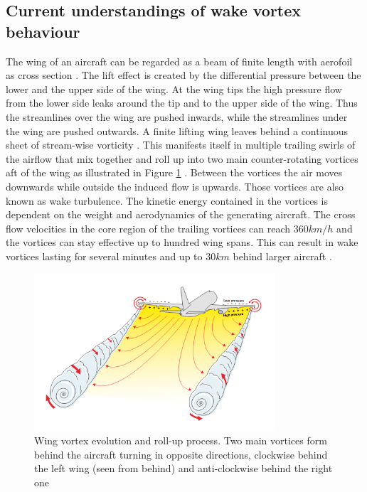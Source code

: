 %



\subsection{Current understandings of wake vortex behaviour}
The wing of an aircraft can be regarded as a beam of finite length with aerofoil as cross section \cite{hansen2015aerodynamics}. The lift effect is created by the differential pressure between the lower and the upper side of the wing. At the wing tips the high pressure flow from the lower side leaks around the tip and to the upper side of the wing. Thus the streamlines over the wing are pushed inwards, while the streamlines under the wing are pushed outwards. A finite lifting wing leaves behind a continuous sheet of stream-wise vorticity  \cite{hansen2015aerodynamics}.  This manifests itself in multiple trailing swirls of the airflow that mix together and roll up into two main counter-rotating vortices aft of the wing as illustrated in Figure \ref{fig:vortex_develop} \cite{magazine_aibus_safety, Breitsamter2011Feb, gerz_commercial_2002}. Between the vortices the air moves downwards while outside the induced flow is upwards. Those vortices are also known as wake turbulence. 
The kinetic energy contained in the vortices is dependent on the weight and aerodynamics of the generating aircraft. The cross flow velocities in the core region of the trailing vortices can reach $360km/h$ and the vortices can stay effective up to hundred wing spans. This can result in wake vortices lasting for several minutes and up to $30km$ behind larger aircraft \cite{Breitsamter2011Feb, gerz_commercial_2002}. 

\begin{figure}
    \centering
    \includegraphics[width=0.8\textwidth]{graphics/WakeVortexPlane.png}
    \caption[Wake vortex roll-up process]{Wing vortex evolution and roll-up process. Two main vortices form behind the aircraft turning in opposite directions, clockwise behind the left wing (seen from behind) and anti-clockwise behind the right one \cite{magazine_aibus_safety}} \label{fig:vortex_develop}
\end{figure}

